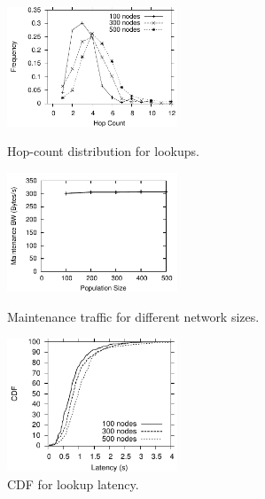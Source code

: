 {\begin{figure}[ht]
\centering
 \begin{minipage}{.3\linewidth}
  \begin{center}
    \includegraphics[width=2in]{graphs/overlays/hop_lookup.pdf}
    \caption{{\small Hop-count distribution for lookups.}\label{chord-hop}}
 \end{center}
\end{minipage}
\hfill
 \begin{minipage}{.3\linewidth}
  \begin{center}
    \includegraphics[width=2in]{graphs/overlays/noChurnBW.pdf}
    \caption{{\small Maintenance traffic for different network sizes.}\label{chord-bw}}
  \end{center}
 \end{minipage}
\hfill
 \begin{minipage}{.3\linewidth}
  \begin{center}
    \includegraphics[width=2in]{graphs/overlays/noChurnLatencyCDF.pdf}
    \caption{{\small CDF for lookup latency.}\label{chord-latency}}
  \end{center}
 \end{minipage}
\end{figure}

}
